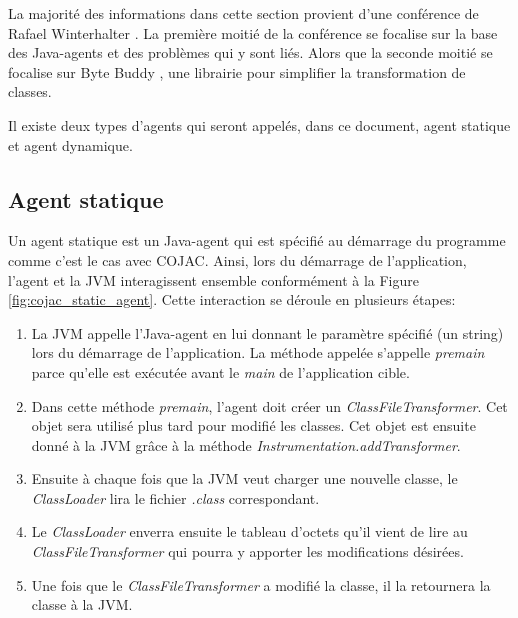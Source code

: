 La majorité des informations dans cette section provient d'une conférence de Rafael Winterhalter \cite{youtube-guide-java-agent}. La première moitié de la conférence se focalise sur la base des \glspl{Java-agent} et des problèmes qui y sont liés. Alors que la seconde moitié se focalise sur Byte Buddy \cite{byte-buddy}, une librairie pour simplifier la transformation de classes.

Il existe deux types d'agents qui seront appelés, dans ce document, agent statique et agent dynamique.

\subsection{Agent statique}

Un agent statique est un \gls{Java-agent} qui est spécifié au démarrage du programme comme c'est le cas avec \gls{COJAC}. Ainsi, lors du démarrage de l'application, l'agent et la \gls{JVM} interagissent ensemble conformément à la Figure \ref{fig:cojac_static_agent}. Cette interaction se déroule en plusieurs étapes:

\begin{enumerate}
    \item La \gls{JVM} appelle l'\gls{Java-agent} en lui donnant le paramètre spécifié (un string) lors du démarrage de l'application. La méthode appelée s'appelle \textit{premain} parce qu'elle est exécutée avant le \textit{main} de l'application cible.
    \item Dans cette méthode \textit{premain}, l'agent doit créer un \textit{ClassFileTransformer}. Cet objet sera utilisé plus tard pour modifié les classes. Cet objet est ensuite donné à la \gls{JVM} grâce à la méthode \textit{Instrumentation.addTransformer}.
    \item Ensuite à chaque fois que la \gls{JVM} veut charger une nouvelle classe, le \textit{ClassLoader} lira le fichier \textit{.class} correspondant.
    \item Le \textit{ClassLoader} enverra ensuite le tableau d'octets qu'il vient de lire au \textit{ClassFileTransformer} qui pourra y apporter les modifications désirées.
    \item Une fois que le \textit{ClassFileTransformer} a modifié la classe, il la retournera la classe à la \gls{JVM}.
\end{enumerate}

\begin{minipage}{\linewidth}%
\label{fig:cojac_static_agent}
\end{minipage}


